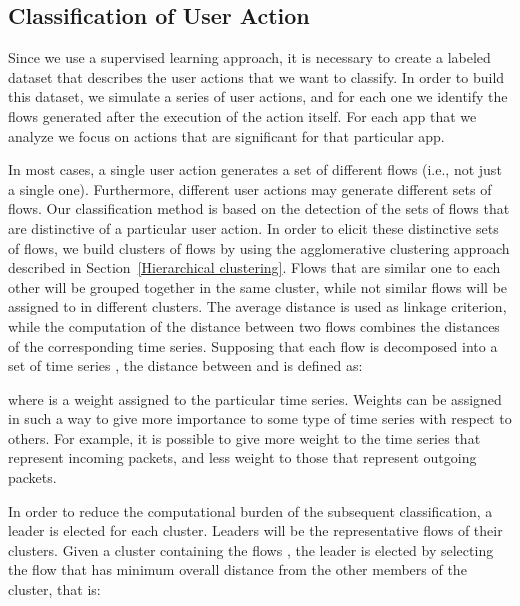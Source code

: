 \documentclass{acm_proc_article-sp}
\newcommand{\hilight}[1]{#1}
\begin{document}
  


\subsection{Classification of User Action} 
\label{ClassificationUserActions}


\label{LabeledDataset}
Since we use a supervised learning approach, it is necessary to create a labeled dataset that
describes the user actions that we want to classify. 
In order to build this dataset, we simulate a series of user actions, and for each one we identify the 
flows generated after the execution of the action itself. For each app that we analyze
we focus on actions that are significant for that particular app. 

In most cases, a single user action generates a set of different flows (i.e., not just a single one). 
Furthermore, different user actions may generate different sets of flows. 
Our classification method is based on the detection of the sets of flows that 
are distinctive of a particular user action.
In order to elicit these distinctive sets of flows, we build clusters
of flows by using the agglomerative clustering approach described in 
Section~\ref{Hierarchical clustering}. 
\hilight{Flows that are similar one to each other will be grouped together in the same cluster, while not similar flows 
will be assigned to in different clusters.} The average distance is used as 
linkage criterion, while the computation of the distance between two flows combines
the distances of the corresponding time series. 
Supposing that each 
flow  is decomposed into a set of  time series 
, the distance between  and  is defined as:

where  is a weight assigned to the particular time series. Weights can be 
assigned in such a way to give more importance to some type of time series with 
respect to others. For example, it is possible to give more weight to the 
time series that represent incoming packets, and less weight to those that 
represent outgoing packets. 




In order to reduce the computational burden of the subsequent classification, a 
leader is elected for each cluster. 
Leaders will be the representative flows of their clusters. 
Given a cluster  containing the flows 
, the leader is elected by selecting the flow  that has 
minimum overall distance from the other members of the cluster, that is: 
\end{document}
